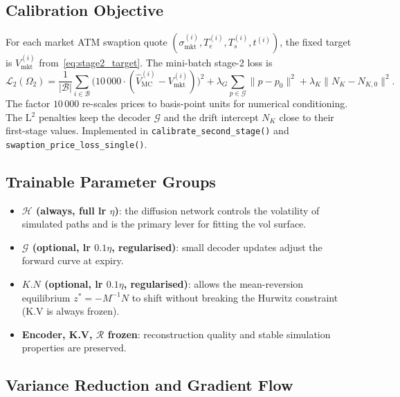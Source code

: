\subsection{Calibration Objective}
\label{subsec:calib_objective}

For each market ATM swaption quote $(\sigma^{(i)}_\mathrm{mkt}, T_e^{(i)}, T_s^{(i)},
t^{(i)})$, the fixed target is $V^{(i)}_\mathrm{mkt}$ from~\eqref{eq:stage2_target}.
The mini-batch stage-2 loss is
\begin{equation}
    \mathcal{L}_2(\Omega_2)
    =
    \frac{1}{|\mathcal{B}|}
    \sum_{i \in \mathcal{B}}
    \bigl(
        10\,000\cdot(\hat{V}^{(i)}_\mathrm{MC} - V^{(i)}_\mathrm{mkt})
    \bigr)^2
    +
    \lambda_G \!\sum_{p \in \mathcal{G}} \lVert p - p_0 \rVert^2
    +
    \lambda_K \lVert N_K - N_{K,0} \rVert^2.
    \label{eq:stage2_loss}
\end{equation}
The factor $10\,000$ re-scales prices to basis-point units for numerical conditioning.
The L$^2$ penalties keep the decoder $\mathcal{G}$ and the drift intercept $N_K$ close
to their first-stage values. Implemented in \texttt{calibrate\_second\_stage()} and
\texttt{swaption\_price\_loss\_single()}.

\subsection{Trainable Parameter Groups}
\label{subsec:param_groups}

\begin{itemize}
    \item \textbf{$\mathcal{H}$ (always, full lr $\eta$)}: the diffusion network controls
    the volatility of simulated paths and is the primary lever for fitting the vol surface.
    \item \textbf{$\mathcal{G}$ (optional, lr $0.1\eta$, regularised)}: small decoder
    updates adjust the forward curve at expiry.
    \item \textbf{$K.N$ (optional, lr $0.1\eta$, regularised)}: allows the
    mean-reversion equilibrium $z^*=-M^{-1}N$ to shift without breaking the
    Hurwitz constraint (K.V is always frozen).
    \item \textbf{Encoder, K.V, $\mathcal{R}$ frozen}: reconstruction quality and
    stable simulation properties are preserved.
\end{itemize}

\subsection{Variance Reduction and Gradient Flow}
\label{subsec:antithetic}

